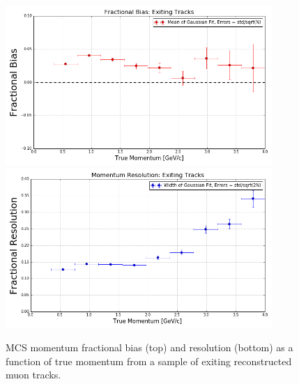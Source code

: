 \documentclass[a4paper,11pt]{article}
\begin{document}
\begin{figure}
\centering
\includegraphics[width=0.9\textwidth]
	{Figures/MCS_true_exiting_bias_MCBNBRecoTrackExiting.png}
\includegraphics[width=0.9\textwidth]
	{Figures/MCS_true_exiting_resolution_MCBNBRecoTrackExiting.png}
\caption{MCS momentum fractional bias (top) and resolution (bottom) as a function of true momentum from a sample of exiting reconstructed muon tracks.}
\label{exitingRecoTrack_bias_resolution_fig_alllengths}
\end{figure}


\end{document}
